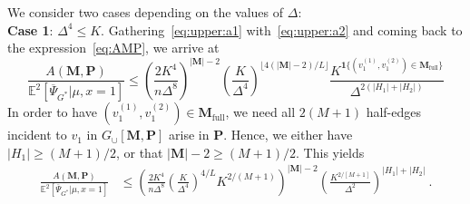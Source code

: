 \documentclass{article}
\begin{document}
We consider two cases depending on the values of $\Delta$:~\\
\noindent 
{\bf Case 1}: $\Delta^4 \leq K$. Gathering~\eqref{eq:upper:a1} with~\eqref{eq:upper:a2} and coming back to the expression~\eqref{eq:AMP}, we arrive at 
\[
\frac{A(\mathbf{M},\mathbf{P})}{\mathbb E^2[\overline{\Psi}_{G^*}|\mu,x=1]}
\leq \left(\frac{2K^4}{n\Delta^8}\right)^{|\mathbf{M}|-2} \left(\frac{K}{\Delta^4}\right)^{\lfloor 4(|\mathbf{M}|-2)/L\rfloor} \frac{K^{\mathbf 1\{(v_1^{(1)},v_1^{(2)})\in \mathbf{M}_{\mathrm{full}}\}}}{\Delta^{2(|H_1|+|H_2|)}}
\]
In order to have $(v_1^{(1)},v_1^{(2)})\in \mathbf{M}_{\mathrm{full}}$, we need all $2(M+1)$ half-edges incident to $v_1$ in $G_{\cup}[\mathbf{M},\mathbf{P}]$ arise in $\mathbf{P}$. Hence, we either have $|H_1|\geq (M+1)/2$, or that $|\mathbf{M}|-2\geq (M+1)/2$. This yields
\begin{align}
    \frac{A(\mathbf{M},\mathbf{P})}{\mathbb E^2[\overline{\Psi}_{G^*}|\mu,x=1]}
&\leq \left(\frac{2K^4}{n\Delta^8} \left(\frac{K}{\Delta^4}\right)^{4/L}K^{2/(M+1)} \right)^{|\mathbf{M}|-2}  \left(\frac{K^{2/[M+1]}}{\Delta^{2}} \right)^{|H_1|+|H_2|}
\label{eq:AMP2} \ . 
\end{align}

\medskip 
\end{document}
